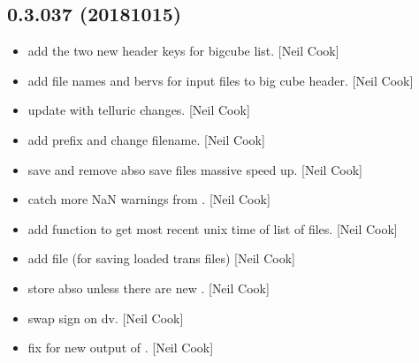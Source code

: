 \documentclass[a4paper,10pt,english]{report}
\begin{document}
\subsection{0.3.037 (2018\sphinxhyphen{}10\sphinxhyphen{}15)}
\label{\detokenize{misc/changelog:id314}}\begin{itemize}
\item {} 
 \sphinxhyphen{} add the two new header keys for bigcube list.
{[}Neil Cook{]}

\item {} 
 \sphinxhyphen{} add file names and bervs for input files to
big cube header. {[}Neil Cook{]}

\item {} 
 \sphinxhyphen{} update with telluric changes. {[}Neil Cook{]}

\item {} 
 \sphinxhyphen{} add prefix and change filename. {[}Neil Cook{]}

\item {} 
 \sphinxhyphen{} save and remove abso save files \sphinxhyphen{} massive speed up.
{[}Neil Cook{]}

\item {} 
 \sphinxhyphen{} catch more NaN warnings from . {[}Neil
Cook{]}

\item {} 
 \sphinxhyphen{} add  function to get most recent unix
time of list of files. {[}Neil Cook{]}

\item {} 
 \sphinxhyphen{} add  file (for saving loaded trans
files) {[}Neil Cook{]}

\item {} 
 \sphinxhyphen{} store abso unless there are new . {[}Neil
Cook{]}

\item {} 
 \sphinxhyphen{} swap sign on dv. {[}Neil Cook{]}

\item {} 
 \sphinxhyphen{} fix for new output of . {[}Neil Cook{]}


\end{itemize}
\end{document}

